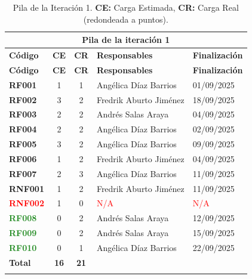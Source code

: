 \begin{longtable}{|l||c|c|p{7cm}|l|}
\multicolumn{5}{c}{Pila de la \textbf{iteración 1}} \\
\hline\hline
\textbf{Código} & \textbf{CE} & \textbf{CR} & \textbf{Responsables} & \textbf{Finalización} \\
\hline
\endfirsthead
\textbf{Código} & \textbf{CE} & \textbf{CR} & \textbf{Responsables} & \textbf{Finalización} \\
\hline\hline
\endhead

\textbf{RF001} & 1 & 1 & Angélica Díaz Barrios & 01/09/2025 \\

\textbf{RF002} & 3 & 2 & Fredrik Aburto Jiménez & 18/09/2025 \\

\textbf{RF003} & 2 & 2 & Andrés Salas Araya & 04/09/2025 \\

\textbf{RF004} & 2 & 2 & Angélica Díaz Barrios & 02/09/2025 \\

\textbf{RF005} & 3 & 2 & Angélica Díaz Barrios & 09/09/2025 \\

\textbf{RF006} & 1 & 2 & Fredrik Aburto Jiménez & 04/09/2025 \\

\textbf{RF007} & 2 & 3 & Angélica Díaz Barrios & 11/09/2025 \\

\textbf{RNF001} & 1 & 2 & Fredrik Aburto Jiménez & 11/09/2025 \\

\textcolor{red}{\textbf{RNF002}} & 1 & 0 & \textcolor{red}{N/A} & \textcolor{red}{N/A} \\

\textcolor{ForestGreen}{\textbf{RF008}} & 0 & 2 & Andrés Salas Araya & 12/09/2025 \\

\textcolor{ForestGreen}{\textbf{RF009}} & 0 & 2 & Andrés Salas Araya & 15/09/2025 \\

\textcolor{ForestGreen}{\textbf{RF010}} & 0 & 1 & Angélica Díaz Barrios & 22/09/2025 \\
\hline
\textbf{Total} & \textbf{16} & \textbf{21} & & \\
\hline

\caption{Pila de la Iteración 1. \textbf{CE:} Carga Estimada, \textbf{CR:} Carga Real (redondeada a puntos).}
\label{SprintBacklog}
\end{longtable}


